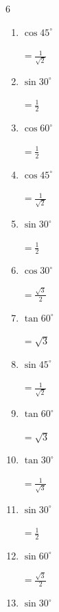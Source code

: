 \begin{multicols}{6}
\begin{enumerate}
        $\displaystyle =\frac{\sqrt{3}}{2}$

  \item $\displaystyle \cos{45^\circ}$

        $\displaystyle =\frac{1}{\sqrt{2}}$

  \item $\displaystyle \sin{30^\circ}$

        $\displaystyle =\frac{1}{2}$

  \item $\displaystyle \cos{60^\circ}$

        $\displaystyle =\frac{1}{2}$

  \item $\displaystyle \cos{45^\circ}$

        $\displaystyle =\frac{1}{\sqrt{2}}$

  \item $\displaystyle \sin{30^\circ}$

        $\displaystyle =\frac{1}{2}$

  \item $\displaystyle \cos{30^\circ}$

        $\displaystyle =\frac{\sqrt{3}}{2}$

  \item $\displaystyle \tan{60^\circ}$

        $\displaystyle =\sqrt{3}$

  \item $\displaystyle \sin{45^\circ}$

        $\displaystyle =\frac{1}{\sqrt{2}}$

  \item $\displaystyle \tan{60^\circ}$

        $\displaystyle =\sqrt{3}$

  \item $\displaystyle \tan{30^\circ}$

        $\displaystyle =\frac{1}{\sqrt{3}}$

  \item $\displaystyle \sin{30^\circ}$

        $\displaystyle =\frac{1}{2}$

  \item $\displaystyle \sin{60^\circ}$

        $\displaystyle =\frac{\sqrt{3}}{2}$

  \item $\displaystyle \sin{30^\circ}$


\end{enumerate}
\end{multicols}
